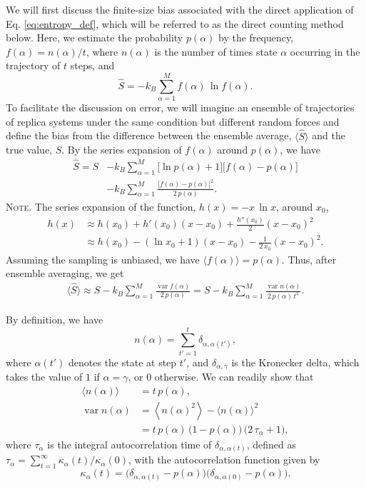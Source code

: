 \documentclass[preprint, superscriptaddress]{revtex4-1}
\newcommand{\note}[1]{{\color{DarkGreen}\footnotesize \textsc{Note.} #1}}
\begin{document}
We will first discuss the finite-size bias associated with
the direct application of Eq. \eqref{eq:entropy_def},
which will be referred to as the direct counting method below.
%
Here, we estimate the probability $p(\alpha)$
by the frequency, $f(\alpha) = n(\alpha) / t$,
where $n(\alpha)$ is the number of times state $\alpha$ occurring in the trajectory of $t$ steps,
and
%
\begin{equation}
  \hat S
  =
  -k_B \sum_{\alpha = 1}^M f(\alpha) \, \ln f(\alpha)
  .
  \label{eq:entropy_est}
\end{equation}
%
To facilitate the discussion on error,
we will imagine an ensemble of trajectories of replica systems
under the same condition but different random forces
and define the bias from the difference
between the ensemble average,
$\langle \hat S \rangle$
and the true value, $S$.
%
By the series expansion of $f(\alpha)$ around $p(\alpha)$, we have
%
\begin{align*}
  \hat S
  =
  S
  &- k_B \sum_{\alpha = 1}^M
    \bigl[\ln p(\alpha) + 1 \bigr]
    \bigl[ f(\alpha) - p(\alpha) \bigr]
  \\
  &- k_B \sum_{\alpha = 1}^M
    \frac{ \bigl[f(\alpha) - p(\alpha)\bigr]^2 } { 2 \, p(\alpha) }
  .
\end{align*}
%
\note{The series expansion of the function, $h(x) = -x \, \ln x$,
around $x_0$,
%
\begin{align*}
  h(x)
  &\approx h(x_0) + h'(x_0) (x - x_0) + \frac{h''(x_0)}{2} (x - x_0)^2 \\
  &\approx h(x_0) - (\ln x_0 + 1) ( x - x_0) - \frac{1}{2 \, x_0} (x - x_0)^2
  .
\end{align*}
}
%
Assuming the sampling is unbiased,
we have $\langle f(\alpha) \rangle = p(\alpha)$.
%
Thus, after ensemble averaging, we get
%
\begin{align*}
  \langle \hat S \rangle
  \approx
  S - k_B \sum_{\alpha = 1}^M
    \frac{ \operatorname{var} f(\alpha) } { 2 \, p(\alpha) }
  =
  S - k_B \sum_{\alpha = 1}^M
    \frac{ \operatorname{var} n(\alpha) } { 2 \, p(\alpha) \, t^2 }
  .
\end{align*}

By definition, we have
$$n(\alpha) = \sum_{t' = 1}^t \delta_{\alpha, \alpha(t')},$$
where $\alpha(t')$ denotes the state at step $t'$,
and $\delta_{\alpha, \gamma}$ is the Kronecker delta,
which takes the value of $1$ if $\alpha = \gamma$, or $0$ otherwise.
%
We can readily show that
\begin{align*}
  \langle n(\alpha) \rangle
  &=
  t \, p(\alpha), \\
  \operatorname{var}{n(\alpha)}
  &=
  \left\langle n(\alpha)^2 \right\rangle - \langle n(\alpha) \rangle^2
  \\
  &=
  t \, p(\alpha) \, \bigl( 1 - p(\alpha) \bigr) \, \bigl(2 \, \tau_\alpha + 1\bigr)
  ,
\end{align*}
%
where $\tau_\alpha$ is the integral autocorrelation time of $\delta_{\alpha, \alpha(t)}$,
defined as $\tau_\alpha = \sum_{t = 1}^\infty \kappa_\alpha(t)/\kappa_\alpha(0)$,
with the autocorrelation function given by
$$
\kappa_\alpha(t) = \bigl(\delta_{\alpha, \alpha(t)} - p(\alpha)\bigr)
\bigl(\delta_{\alpha, \alpha(0)} - p(\alpha)\bigr).
$$
\end{document}
